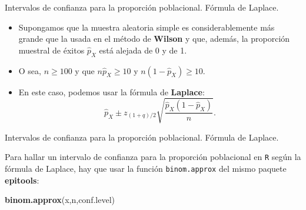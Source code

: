 \documentclass[ignorenonframetext,]{beamer}
\newenvironment{Shaded}{\begin{snugshade}}{\end{snugshade}}
\newcommand{\KeywordTok}[1]{\textcolor[rgb]{0.13,0.29,0.53}{\textbf{#1}}}
\newcommand{\NormalTok}[1]{#1}
\begin{document}
\begin{frame}{Intervalos de confianza para la proporción poblacional.
Fórmula de Laplace.}
\protect\hypertarget{intervalos-de-confianza-para-la-proporcion-poblacional.-formula-de-laplace.}{}

\begin{itemize}
\item
  Supongamos que la muestra aleatoria simple es considerablemente más
  grande que la usada en el método de \textbf{Wilson} y que, además, la
  proporción muestral de éxitos \(\widehat{p}_{X}\) está alejada de 0 y
  de 1.
\item
  O sea, \(n\geq 100\) y que \(n\widehat{p}_{X}\geq 10\) y
  \(n(1-\widehat{p}_{X})\geq 10\).
\item
  En este caso, podemos usar la fórmula de \textbf{Laplace}: \[
  \widehat{p}_{X}\pm z_{(1+q)/2}\sqrt{\frac{\widehat{p}_{X}
  (1-\widehat{p}_{X})}{n}}.
  \]
\end{itemize}

\end{frame}

\begin{frame}[fragile]{Intervalos de confianza para la proporción
poblacional. Fórmula de Laplace.}
\protect\hypertarget{intervalos-de-confianza-para-la-proporcion-poblacional.-formula-de-laplace.-1}{}

Para hallar un intervalo de confianza para la proporción poblacional en
\texttt{R} según la fórmula de Laplace, hay que usar la función
\texttt{binom.approx} del mismo paquete \textbf{epitools}:

\begin{Shaded}
\begin{Highlighting}[]
\KeywordTok{binom.approx}\NormalTok{(x,n,conf.level)}
\end{Highlighting}
\end{Shaded}

\end{frame}
\end{document}
